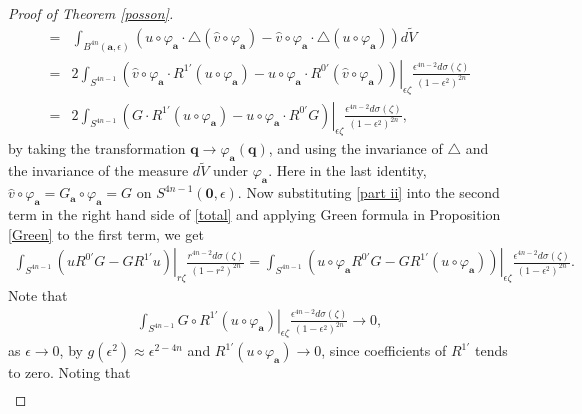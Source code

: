 \documentclass[10pt,a4paper]{amsart}
\begin{document}
\begin{proof}[Proof of Theorem \ref{posson}]
\begin{equation}
\begin{aligned}
=&\int_{B^{4n}(\mathbf{a},\epsilon)}\left(u\circ\varphi_{\mathbf{a}}\cdot\triangle (\widehat{v}\circ\varphi_{\mathbf{a}})-\widehat{v}\circ\varphi_{\mathbf{a}}\cdot\triangle (u\circ\varphi_{\mathbf{a}})\right) d\widetilde{V}\\
=&2\int_{S^{4n-1}}\left.\left(\widehat{v}\circ\varphi_{\mathbf{a}}\cdot R^{1'}(u\circ\varphi_{\mathbf{a}})-u\circ\varphi_{\mathbf{a}}\cdot R^{0'}(\widehat{v}\circ\varphi_{\mathbf{a}})\right)\right|_{\epsilon\zeta}\frac{\epsilon^{4n-2}d\sigma(\zeta)}{(1-\epsilon^2)^{2n}}\\
=&2\int_{S^{4n-1}}\left.\left(G\cdot R^{1'}(u\circ\varphi_{\mathbf{a}})-u\circ\varphi_{\mathbf{a}}\cdot R^{0'}G\right)\right|_{\epsilon\zeta}\frac{\epsilon^{4n-2}d\sigma(\zeta)}{(1-\epsilon^2)^{2n}},
\end{aligned}\end{equation}
by taking the transformation $\mathbf{q}\rightarrow \varphi_{\mathbf{a}}(\mathbf{q})$, and using the invariance of $\triangle$ and the invariance of the measure $d\widetilde{V}$ under $\varphi_{\mathbf{a}}$. Here in the last identity, $\widehat{v}\circ\varphi_{\mathbf{a}}=G_{\mathbf{a}}\circ\varphi_{\mathbf{a}}=G$ on $S^{4n-1}(\mathbf{0},\epsilon)$.
Now substituting \eqref{part ii} into the second term in the right hand side of \eqref{total} and applying Green formula in Proposition \ref{Green} to the first term, we get
\begin{equation*}\begin{aligned}
\int_{S^{4n-1}}\left.(uR^{0'}G-G R^{1'}u)\right|_{r\zeta}\frac{r^{4n-2}d\sigma(\zeta)}{(1-r^2)^{2n}}
=\int_{S^{4n-1}}\left.\left(u\circ\varphi_{\mathbf{a}} R^{0'}G -G R^{1'}(u\circ\varphi_{\mathbf{a}})\right)\right|_{\epsilon\zeta}\frac{\epsilon^{4n-2}d\sigma(\zeta)}{(1-\epsilon^2)^{2n}}.
\end{aligned}\end{equation*}
Note that
\begin{equation*}\begin{aligned}
\int_{S^{4n-1}}\left.G\circ R^{1'}(u\circ\varphi_{\mathbf{a}})\right|_{\epsilon\zeta}\frac{\epsilon^{4n-2}d\sigma(\zeta)}{(1-\epsilon^2)^{2n}}\rightarrow 0,
\end{aligned}\end{equation*}
as $\epsilon\rightarrow 0$, by $g(\epsilon^2)\approx \epsilon^{2-4n}$ and $R^{1'}(u\circ\varphi_{\mathbf{a}})\rightarrow 0$, since coefficients of $R^{1'}$ tends to zero. Noting that
\begin{equation*}\begin{aligned}

\end{aligned}
\end{equation*}
\end{proof}
\end{document}
